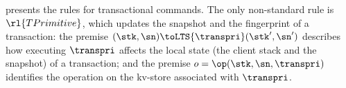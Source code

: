  presents the rules for transactional commands. 
The only non-standard rule is \( \rl{TPrimitive} \), which updates 
the snapshot and the fingerprint of a transaction: the premise 
$(\stk, \sn) \toLTS{\transpri} (\stk', \sn')$ describes how executing
$\transpri$ affects the local state (the client stack and the snapshot)
of a transaction; and the premise $o =\op(\stk, \sn, \transpri)$ identifies the operation on the 
kv-store associated with $\transpri$. 

